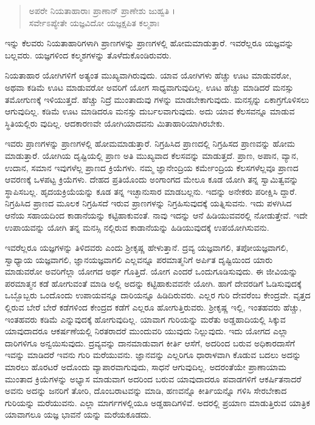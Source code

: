 \begin{verse}
ಅಪರೇ ನಿಯತಾಹಾರಾಃ ಪ್ರಾಣಾನ್ ಪ್ರಾಣೇಶು ಜುಹ್ವತಿ ।\\ಸರ್ವೇಽಪ್ಯೇತೇ ಯಜ್ಞವಿದೋ ಯಜ್ಞಕ್ಷಪಿತ ಕಲ್ಮಶಾಃ 
\end{verse}

{\small ಇನ್ನು ಕೆಲವರು ನಿಯತಾಹಾರಿಗಳಾಗಿ ಪ್ರಾಣಗಳನ್ನು ಪ್ರಾಣಗಳಲ್ಲಿ ಹೋಮಮಾಡುತ್ತಾರೆ. ಇವರೆಲ್ಲರೂ ಯಜ್ಞವನ್ನು ಬಲ್ಲವರು. ಯಜ್ಞಗಳಿಂದ ಕಲ್ಮಶಗಳನ್ನು ತೊಳೆದುಕೊಂಡಿರುವರು.}

ನಿಯತಾಹಾರ ಯೋಗಿಗಳಿಗೆ ಅತ್ಯಂತ ಮುಖ್ಯವಾಗಿರುವುದು. ಯಾವ ಯೋಗಿಗಳು ಹೆಚ್ಚು ಊಟ ಮಾಡುವರೋ, ಅಥವಾ ಕಡಿಮೆ ಊಟ ಮಾಡುವರೋ ಅವರಿಗೆ ಯೋಗ ಸಾಧ್ಯವಾಗುವುದಿಲ್ಲ. ಊಟ ಹೆಚ್ಚು ಮಾಡಿದರೆ ಮನಸ್ಸು ತಮೋಗುಣಕ್ಕೆ ಇಳಿಯುತ್ತದೆ. ಹೆಚ್ಚು ನಿದ್ರೆ ಮುಂತಾದುವು ಗಳನ್ನು ಮಾಡಬೇಕಾಗುವುದು. ಮನಸ್ಸನ್ನು ಏಕಾಗ್ರಗೊಳಿಸಲು ಆಗುವುದಿಲ್ಲ. ಕಡಿಮೆ ಊಟ ಮಾಡಿದರೂ ಮನಸ್ಸು ದುರ್ಬಲವಾಗುವುದು. ಅದು ಯಾವ ಕೆಲಸವನ್ನೂ ಮಾಡುವ ಸ್ಥಿತಿಯಲ್ಲಿರು ವುದಿಲ್ಲ. ಆದಕಾರಣವೇ ಯೋಗಿಯಾದವನು ಮಿತಾಹಾರಿಯಾಗಿರಬೇಕು.

ಇವರು ಪ್ರಾಣಗಳನ್ನು ಪ್ರಾಣಗಳಲ್ಲಿ ಹೋಮಮಾಡುತ್ತಾರೆ. ನಿಗ್ರಹಿಸಿದ ಪ್ರಾಣದಲ್ಲಿ ನಿಗ್ರಹಿಸದ ಪ್ರಾಣವನ್ನು ಹೋಮ ಮಾಡುತ್ತಾರೆ. ಯೋಗಿಯ ದೃಷ್ಟಿಯಲ್ಲಿ ಪ್ರಾಣ ಅತಿ ಮುಖ್ಯವಾದ ಕೆಲಸವನ್ನು ಮಾಡುತ್ತದೆ. ಪ್ರಾಣ, ಅಪಾನ, ವ್ಯಾನ, ಉದಾನ, ಸಮಾನ ಇವುಗಳೆಲ್ಲ ಪ್ರಾಣದ ಕ್ರಿಯೆಗಳು. ನಮ್ಮ ಜ್ಞಾನೇಂದ್ರಿಯ ಕರ್ಮೇಂದ್ರಿಯ ಕೆಲಸಗಳೆಲ್ಲವೂ ಪ್ರಾಣದ ಆವರಣಕ್ಕೆ ಒಳಪಟ್ಟ ಕ್ರಿಯೆಗಳು. ದೇಹದ ಪ್ರತಿಯೊಂದು ಅಂಗಾಂಗದ ಮೇಲೂ ಕೂಡ ಯೋಗಿ ತನ್ನ ಸ್ವಾಮಿತ್ವವನ್ನು ಸ್ಥಾಪಿಸಬಲ್ಲ. ಹೃದಯಕ್ರಿಯೆಯನ್ನು ಕೂಡ ತನ್ನ ಇಚ್ಛಾನುಸಾರ ಮಾಡಬಲ್ಲನು. ಇದನ್ನು ಅನೇಕರು ಪರೀಕ್ಷಿಸಿ ದ್ದಾರೆ. ನಿಗ್ರಹಿಸಿದ ಪ್ರಾಣದ ಮೂಲಕ ನಿಗ್ರಹಿಸದೆ ಇರುವ ಪ್ರಾಣಗಳನ್ನು ನಿಗ್ರಹಿಸುವುದಕ್ಕೆ ಯತ್ನಿಸುವನು. ಇದು ಪಳಗಿಸಿದ ಆನೆಯ ಸಹಾಯದಿಂದ ಕಾಡಾನೆಯನ್ನು ಕಟ್ಟಿಹಾಕುವಂತೆ. ನಾವು ಇದನ್ನು ಆನೆ ಹಿಡಿಯುವವರಲ್ಲಿ ನೋಡುತ್ತೇವೆ. ಇದೇ ಉಪಾಯವನ್ನು ಯೋಗಿ ತನ್ನ ಮನಸ್ಸಿ ನಲ್ಲಿರುವ ಕಾಡಾನೆಯನ್ನು ಹಿಡಿಯುವುದಕ್ಕೆ ಉಪಯೋಗಿಸುವನು.

ಇವರೆಲ್ಲರೂ ಯಜ್ಞಗಳನ್ನು ತಿಳಿದವರು ಎಂದು ಶ್ರೀಕೃಷ್ಣ ಹೇಳುತ್ತಾನೆ. ದ್ರವ್ಯ ಯಜ್ಞವಾಗಲಿ, ತಪೋಯಜ್ಞವಾಗಲಿ, ಸ್ವಾಧ್ಯಾಯ ಯಜ್ಞವಾಗಲಿ, ಜ್ಞಾನಯಜ್ಞವಾಗಲಿ ಎಲ್ಲವನ್ನೂ ಪರಮಾತ್ಮನಿಗೆ ಅರ್ಪಿತ ದೃಷ್ಟಿಯಿಂದ ಯಾರು ಮಾಡುವರೋ ಅವರಿಗೆಲ್ಲಾ ಯೋಗದ ಅರ್ಥ ಗೊತ್ತಿದೆ. ಯೋಗ ಎಂದರೆ ಒಂದುಗೂಡಿಸುವುದು. ಈ ಜೀವಿಯನ್ನು ಪರಮಾತ್ಮನ ಕಡೆ ಹೋಗುವಂತೆ ಮಾಡಿ ಅಲ್ಲಿ ಅದನ್ನು ಕಟ್ಟಿಹಾಕುವವನೇ ಯೋಗಿ. ಹಾಗೆ ದೇವರಡಿಗೆ ಓಡಿಸುವುದಕ್ಕೆ ಒಬ್ಬೊಬ್ಬರು ಒಂದೊಂದು ಉಪಾಯವನ್ನೂ ದಾರಿಯನ್ನೂ ಹಿಡಿದಿರುವರು. ಎಲ್ಲರ ಗುರಿ ದೇವರೆಂಬ ಕೇಂದ್ರವೇ. ವೃತ್ತದ ಲ್ಲಿರುವ ಬೇರೆ ಬೇರೆ ಕಡೆಗಳಿಂದ ಕೇಂದ್ರದ ಕಡೆಗೆ ಎಲ್ಲರೂ ಹೋಗುತ್ತಿರುವರು. ಶ್ರೀಕೃಷ್ಣ ಇಲ್ಲಿ, ಇಂತಹವರು ಹೆಚ್ಚು, ಇಂತಹವರು ಕಡಿಮೆ ಎನ್ನುವುದಕ್ಕೆ ಹೋಗುವುದಿಲ್ಲ. ಯಾವಾಗ ಗುರಿಯನ್ನು ಮರೆತು ಅಡ್ಡಹಾದಿಯಲ್ಲಿ ಸಿಕ್ಕುವ ಯಾವುದಾದರೂ ಆಕರ್ಷಣೆಯಲ್ಲಿ ನಿರತರಾದರೆ ಮುಂದುವರಿ ಯುವುದು ನಿಲ್ಲುವುದು. ಇದು ಯೋಗದ ಎಲ್ಲಾ ದಾರಿಗಳಿಗೂ ಅನ್ವಯಿಸುವುದು. ದ್ರವ್ಯವನ್ನು ದಾನಮಾಡುವಾಗ ಕೀರ್ತಿ ಆಸೆಗೆ, ಅದರಿಂದ ಬರುವ ಅಧಿಕಾರದಾಸೆಗೆ ಇವನ್ನು ಮಾಡಿದರೆ ಇವನು ಗುರಿ ಮರೆಯುವನು. ಜ್ಞಾನವನ್ನು ಎಲ್ಲರಿಗೂ ಧಾರಾಳವಾಗಿ ಕೊಡುವ ಬದಲು ಅದನ್ನು ಮಾರಲು ಹೊರಟರೆ ಅದೊಂದು ವ್ಯಾಪಾರವಾಗುವುದು, ಸಾಧನೆ ಆಗುವುದಿಲ್ಲ. ಅದರಂತೆಯೇ ಪ್ರಾಣಾಯಾಮ ಮುಂತಾದ ಕ್ರಿಯೆಗಳನ್ನು ಅಭ್ಯಾಸ ಮಾಡುವಾಗ ಅದರಿಂದ ಬರುವ ಯಾವುದಾದರೂ ಪವಾಡಗಳಿಗೆ ಆಕರ್ಷಿತನಾದರೆ ಅವನು ಅದನ್ನು ಜನರಿಗೆ ತೋರಿ, ದೊಂಬರಾಟವನ್ನು ಮಾಡಿ, ಹಣವನ್ನೊ ಕೀರ್ತಿಯನ್ನೊ ಗಳಿಸಿ ಸೇರಬೇಕಾದ ಗುರಿಯನ್ನು ಮರೆಯುವನು. ಎಲ್ಲಾ ಮಾರ್ಗಗಳಲ್ಲಿಯೂ ಅಡ್ಡಹಾದಿಗಳಿವೆ. ಅದರಲ್ಲಿ ಪ್ರಯಾಣ ಮಾಡುತ್ತಿರುವ ಯಾತ್ರಿಕ ಯಾವಾಗಲೂ ಯಜ್ಞ ಭಾವನೆ ಯನ್ನು ಮರೆಯಕೂಡದು.

